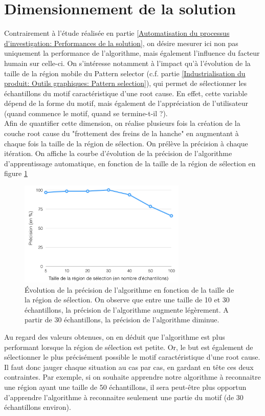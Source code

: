 \section{Dimensionnement de la solution}
\label{Industrialisation du produit: Dimensionnement de la solution}
Contrairement à l'étude réalisée en partie \ref{Automatisation du processus d'investigation: Performances de la solution}, on désire mesurer ici non pas uniquement la performance de l'algorithme, mais également l'influence du facteur humain sur celle-ci. On s'intéresse notamment à l'impact qu'à l'évolution de la taille de la région mobile du Pattern selector (c.f. partie \ref{Industrialisation du produit: Outils graphiques: Pattern selection}), qui permet de sélectionner les échantillons du motif caractéristique d'une root cause. En effet, cette variable dépend de la forme du motif, mais également de l'appréciation de l'utilisateur (quand commence le motif, quand se termine-t-il ?). \\
Afin de quantifier cette dimension, on réalise plusieurs fois la création de la couche root cause du "frottement des freins de la hanche" en augmentant à chaque fois la taille de la région de sélection. On prélève la précision à chaque itération. On affiche la courbe d'évolution de la précision de l'algorithme d'apprentissage automatique, en fonction de la taille de la région de sélection en figure \ref{fig: Evolution de la précision de l'algorithme en fonction de la taille de la région de sélection}

\begin{figure}[H]
	\centering\includegraphics[height=5cm]{images/precision_taille.png}
	\caption[Evolution de la précision de l'algorithme en fonction de la taille de la région de sélection]{Évolution de la précision de l'algorithme en fonction de la taille de la région de sélection.  On observe que entre une taille de 10 et 30 échantillons, la précision de l'algorithme augmente légèrement. A partir de 30 échantillons, la précision de l'algorithme diminue.}
	\label{fig: Evolution de la précision de l'algorithme en fonction de la taille de la région de sélection}
\end{figure} 

Au regard des valeurs obtenues, on en déduit que l'algorithme est plus performant lorsque la région de sélection est petite. Or, le but est également de sélectionner le plus précisément possible le motif caractéristique d'une root cause. Il faut donc jauger chaque situation au cas par cas,  en gardant en tête ces deux contraintes. Par exemple, si on souhaite apprendre notre algorithme à reconnaitre une région ayant une taille de 50 échantillons, il sera peut-être plus opportun d'apprendre l'algorithme à reconnaitre seulement une partie du motif (de 30 échantillons environ).